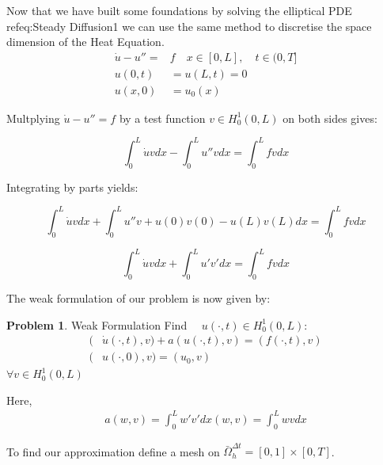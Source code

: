 \documentclass{uonmathreport}
\theoremstyle{definition}
\theoremstyle{problem}
\newtheorem{problem}{Problem}[section]
\theoremstyle{theorem}
\begin{document}
Now that we have built some foundations by solving the elliptical PDE ref{eq:Steady Diffusion1} we can use the same method to discretise the space dimension of the Heat Equation.
\begin{subequations} 
\begin{align}
  \dot{u} - u'' = & f \quad x \in [0, L], \quad t \in (0, T]  \\ \label{eq:Simple Heat}
  u(0, t) & = u(L, t) = 0\\
  u(x, 0) & = u_0(x)   
\end{align}
\end{subequations}

Multplying $\dot{u} - u'' = f$ by a test function  $v \in H^1_0(0, L)$  on both sides gives:

\begin{equation*}
  \int_0^L \dot{u} v dx  - \int_0^L  u'' v  dx =   \int_0^L  f v  dx   
\end{equation*}

Integrating by parts yields:

\begin{equation*}
  \int_0^L \dot{u} v dx  + \int_0^L  u'' v  +u(0)v(0) - u(L)v(L) dx =   \int_0^L  f v  dx   
\end{equation*}

\begin{equation*}
  \int_0^L \dot{u} v dx +  \int_0^L  u' v'  dx =   \int_0^L  f v  dx    
\end{equation*}

The weak formulation of our problem is now given by:

\begin{problem}{Weak Formulation} \label{weak2}
Find $\quad u(\cdot, t) \in H^1_0(0, L)$:
\begin{align*}
	(&\dot{u}(\cdot, t), v) + a(u(\cdot, t), v) = (f(\cdot, t), v)\\
	(&u(\cdot, 0), v) = (u_0, v)
\end{align*}
$\forall v \in H^1_0(0, L)$
\end{problem}
Here,
\begin{align*}
 a(w, v)  = \int_0^L  w' v'  dx 
 (w, v) = \int_0^L  w v  dx 
\end{align*}


To find our approximation define a mesh on $\bar{\Omega}^{\Delta t}_h =[0, 1] \times [0, T]$.\\
\end{document}
